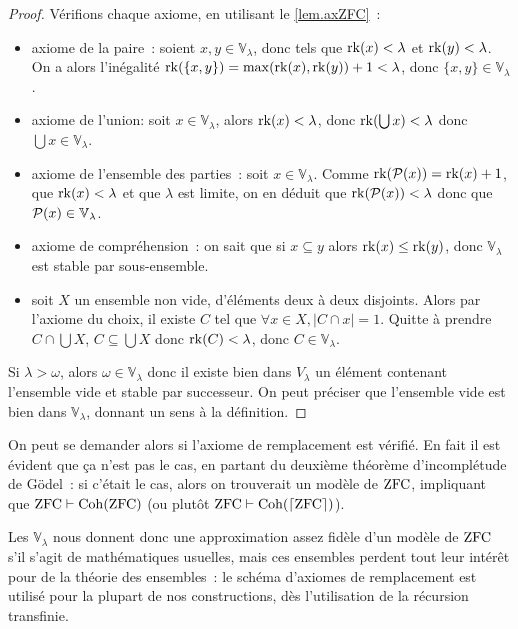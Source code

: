\begin{proof}
  Vérifions chaque axiome, en utilisant le \cref{lem.axZFC}~:
  \begin{itemize}
  \item axiome de la paire~: soient $x,y\in \mathbb V_\lambda$, donc tels que
    $\operatorname{rk}(x) <\lambda$ et $\operatorname{rk}(y)<\lambda$. On a alors  l'inégalité
    $\operatorname{rk}(\{x,y\}) = \max(\operatorname{rk}(x),\operatorname{rk}(y)) + 1 < \lambda$, donc
    $\{x,y\}\in\mathbb V_\lambda$.
  \item axiome de l'union: soit $x\in \mathbb V_\lambda$, alors
    $\operatorname{rk}(x) < \lambda$, donc $\operatorname{rk}(\bigcup x) < \lambda$ donc
    $\bigcup x \in \mathbb V_\lambda$.
  \item axiome de l'ensemble des parties~: soit $x\in \mathbb V_\lambda$. Comme
    $\operatorname{rk}(\mathcal{P}(x)) = \operatorname{rk}(x) + 1$, que $\operatorname{rk}(x) < \lambda$ et que $\lambda$
    est limite, on en déduit que $\operatorname{rk}(\mathcal{P}(x)) < \lambda$ donc que
    $\mathcal{P}(x) \in \mathbb V_\lambda$.
  \item axiome de compréhension~: on sait que si $x\subseteq y$ alors
    $\operatorname{rk}(x) \leq \operatorname{rk}(y)$, donc $\mathbb V_{\lambda}$ est stable par
    sous-ensemble.
  \item soit $X$ un ensemble non vide, d'éléments deux à deux disjoints. Alors
    par l'axiome du choix, il existe $C$ tel que $\forall x \in X,|C\cap x|=1$.
    Quitte à prendre $C \cap \bigcup X$, $C\subseteq \bigcup X$ donc
    $\operatorname{rk}(C) < \lambda$, donc $C\in \mathbb V_\lambda$.
  \end{itemize}

  Si $\lambda > \omega$, alors $\omega \in \mathbb V_\lambda$ donc il existe
  bien dans $V_\lambda$ un élément contenant l'ensemble vide et stable par
  successeur. On peut préciser que l'ensemble vide est bien dans
  $\mathbb V_\lambda$, donnant un sens à la définition.
\end{proof}

On peut se demander alors si l'axiome de remplacement est vérifié. En fait il
est évident que ça n'est pas le cas, en partant du deuxième théorème
d'incomplétude de Gödel~: si c'était le cas, alors on trouverait un modèle de
$\operatorname{ZFC}$, impliquant que $\operatorname{ZFC}\vdash \operatorname{Coh}(\operatorname{ZFC})$ (ou plutôt
$\operatorname{ZFC}\vdash \operatorname{Coh}(\lceil \operatorname{ZFC}\rceil)$).

Les $\mathbb V_\lambda$ nous donnent donc une approximation assez fidèle d'un
modèle de $\operatorname{ZFC}$ s'il s'agit de mathématiques usuelles, mais ces ensembles
perdent tout leur intérêt pour de la théorie des ensembles~: le schéma d'axiomes
de remplacement est utilisé pour la plupart de nos constructions, dès
l'utilisation de la récursion transfinie.

